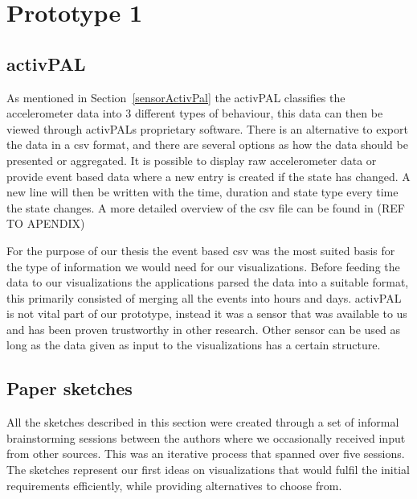 \chapter{Prototype 1}

\section{activPAL}
As mentioned in Section~\ref{sensorActivPal} the activPAL classifies the accelerometer data into 3 different types of behaviour, this data can then be viewed through activPALs proprietary software. There is an alternative to export the data in a \gls{csv} format, and there are several options as how the data should be presented or aggregated. It is possible to display raw accelerometer data or provide event based data where a new entry is created if the state has changed. A new line will then be written with the time, duration and state type every time the state changes. A more detailed overview of the \gls{csv} file can be found in (REF TO APENDIX)

For the purpose of our thesis the event based \gls{csv} was the most suited basis for the type of information we would need for our visualizations. Before feeding the data to our visualizations the applications parsed the data into a suitable format, this primarily consisted of merging all the events into hours and days. activPAL is not vital part of our prototype, instead it was a sensor that was available to us and has been proven trustworthy in other research. Other sensor can be used as long as the data given as input to the visualizations has a certain structure.



\section{Paper sketches}
All the sketches described in this section were created through a set of informal brainstorming sessions between the authors where we occasionally received input from other sources. This was an iterative process that spanned over five sessions. The sketches represent our first ideas on visualizations that would fulfil the initial requirements efficiently, while providing alternatives to choose from. 

